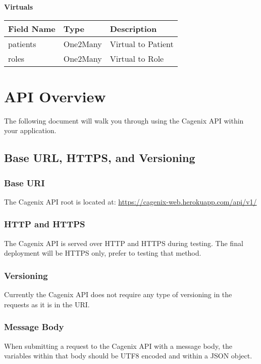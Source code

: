 \documentclass[letterpaper,10pt,english]{sphinxmanual}
\begin{document}
\textbf{Virtuals}

\begin{tabulary}{\linewidth}{|L|L|L|}
\hline
\textsf{\relax 
Field Name
} & \textsf{\relax 
Type
} & \textsf{\relax 
Description
}\\
\hline
patients
 & 
One2Many
 & 
Virtual to Patient
\\

roles
 & 
One2Many
 & 
Virtual to Role
\\
\hline\end{tabulary}



\chapter{API Overview}
\label{dev-api-overview:api-overview}\label{dev-api-overview::doc}
The following document will walk you through using the Cagenix API
within your application.


\section{Base URL, HTTPS, and Versioning}
\label{dev-api-overview:base-url-https-and-versioning}

\subsection{Base URI}
\label{dev-api-overview:base-uri}
The Cagenix API root is located at:
\href{https://cagenix-web.herokuapp.com/api/v1/}{https://cagenix-web.herokuapp.com/api/v1/}


\subsection{HTTP and HTTPS}
\label{dev-api-overview:http-and-https}
The Cagenix API is served over HTTP and HTTPS during testing. The final
deployment will be HTTPS only, prefer to testing that method.


\subsection{Versioning}
\label{dev-api-overview:versioning}
Currently the Cagenix API does not require any type of versioning in the
requests as it is in the URI.


\subsection{Message Body}
\label{dev-api-overview:message-body}
When submitting a request to the Cagenix API with a message body, the
variables within that body should be UTF8 encoded and within a JSON object.
\end{document}
